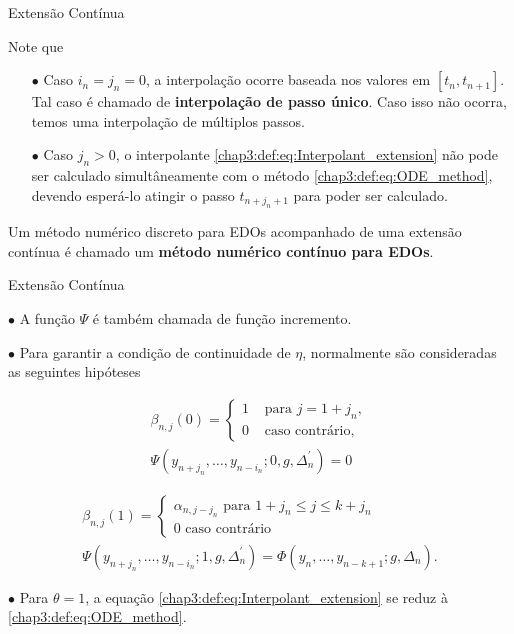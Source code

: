 \documentclass{beamer}
\theoremstyle{plain}
\theoremstyle{definition}
\begin{document}
\begin{frame}{Extensão Contínua}

    Note que

    \begin{itemize}
        \item[$\bullet$] Caso $i_n = j_n = 0$, a interpolação ocorre baseada nos valores em $[t_n, t_{n+1}]$. Tal caso é chamado de \textbf{interpolação de passo único}. Caso isso não ocorra, temos uma interpolação de múltiplos passos. 
        \item[$\bullet$] Caso $j_{n} > 0$, o interpolante \eqref{chap3:def:eq:Interpolant_extension} não pode ser calculado simultâneamente com o método \eqref{chap3:def:eq:ODE_method}, devendo esperá-lo atingir o passo $t_{n + j_n + 1}$ para poder ser calculado.
    \end{itemize}


    Um método numérico discreto para EDOs acompanhado de uma extensão contínua é chamado um \textbf{método numérico contínuo para EDOs}. 


\end{frame}



\begin{frame}{Extensão Contínua}

    \phantom{aa} $\bullet$ A função $\Psi$ é também chamada de função incremento. 

    \phantom{aa} $\bullet$ Para garantir a condição de continuidade de $\eta$, normalmente são consideradas as seguintes hipóteses

    \[
        \begin{gathered}
            \beta_{n, j}(0)= \begin{cases}1 & \text { para } j=1+j_{n}, \\
            0 & \text { caso contrário, }\end{cases} \\
            \Psi\left(y_{n+j_{n}}, \ldots, y_{n-i_{n}} ; 0, g, \Delta_{n}^{\prime}\right)=0
            \end{gathered}
    \]

    \[
        \begin{gathered}
            \beta_{n, j}(1)=\left\{\begin{array}{l}
                    \alpha_{n, j-j_{n}} \text { para } 1+j_{n} \leq j \leq k+j_{n} \\
                    0 \text { caso contrário }
            \end{array}\right. \\
            \Psi\left(y_{n+j_{n}}, \ldots, y_{n-i_{n}} ; 1, g, \Delta_{n}^{\prime}\right)=\Phi\left(y_{n}, \ldots, y_{n-k+1} ; g, \Delta_{n}\right).
        \end{gathered}
    \]


        \phantom{aa} $\bullet$ Para $\theta=1$, a equação \eqref{chap3:def:eq:Interpolant_extension} se reduz à \eqref{chap3:def:eq:ODE_method}. 

    \end{frame}
\end{document}
